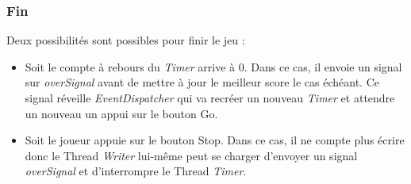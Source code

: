 \documentclass[a4paper,11pt]{article}
\begin{document}
\subsubsection{Fin}
Deux possibilités sont possibles pour finir le jeu :
\begin{itemize}
\item Soit le compte à rebours du \textit{Timer} arrive à 0. Dans ce cas, il envoie un signal sur \textit{overSignal} avant de mettre à jour le meilleur score le cas échéant. Ce signal réveille \textit{EventDispatcher} qui va recréer un nouveau \textit{Timer} et attendre un nouveau un appui sur le bouton Go.
\item Soit le joueur appuie sur le bouton Stop. Dans ce cas, il ne compte plus écrire donc le Thread \textit{Writer} lui-même peut se charger d'envoyer un signal \textit{overSignal} et d'interrompre le Thread \textit{Timer}.
\end{itemize}
\end{document}
